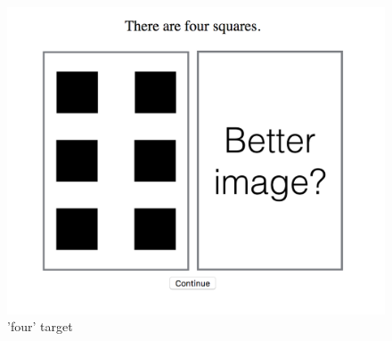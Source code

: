 \documentclass[]{article}
\begin{document}
\begin{figure}[h]
\begin{minipage}[b]{0.3\textwidth}
\includegraphics[width=\textwidth]{four_test.png} 
\caption{'four' target }
\end{minipage}
\end{figure}
\end{document}
